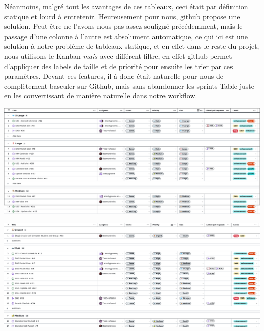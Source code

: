 \documentclass[a4paper,french,final]{memoir}
\begin{document}
Néanmoins, malgré tout les avantages de ces tableaux, ceci était par définition statique et lourd à entretenir. Heureusement pour nous, github propose une solution.
Peut-être ne l'avons-nous pas assez souligné précédemment, mais le passage d'une colonne à l'autre est absolument automatique, ce qui ici est
une solution à notre problème de tableaux statique, et en effet dans le reste du projet, nous utilisons le Kanban \emph{mais} avec différent
filtre, en effet github permet d'appliquer des labels de taille et de priorité pour ensuite les trier par ces paramètres.
Devant ces features, il à donc était naturelle pour nous de complètement basculer sur Github, mais sans abandonner les sprints Table juste
en les convertissant de manière naturelle dans notre workflow.

\begin{center}
    

\begin{minipage}{0.4\textwidth}

\begin{center}
    \includegraphics[width=\textwidth]{figures/size.png}
\end{center}

\end{minipage}
\begin{minipage}{0.4\textwidth}

\begin{center}
    \includegraphics[width=\textwidth]{figures/urgency.png}
\end{center}

\end{minipage}

\end{center}
\end{document}
